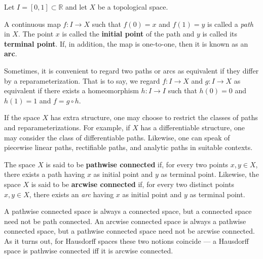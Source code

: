 \documentclass[12pt]{article}
\begin{document}
Let $I=[0,1] \subset \mathbb{R}$ and let $X$ be a topological space.

A continuous map $f:I\rightarrow X$ such that $f(0)=x$ and $f(1)=y$ is called a \emph{path} in $X$.  The point $x$ is called the {\bf initial point} of the path and $y$ is called its {\bf terminal point}.  If, in addition, the map is one-to-one, then it is known as an {\bf arc}.

Sometimes, it is convenient to regard two paths or arcs as equivalent if they differ by a reparameterization.  That is to say, we regard $f \colon I \to X$ and $g \colon I \to X$ as equivalent if there exists a homeomorphism $h \colon I \to I$ such that $h(0) = 0$ and $h(1) = 1$ and $f = g \circ h$.

If the space $X$ has extra structure, one may choose to restrict the classes of paths and reparameterizations.  For example, if $X$ has a differentiable structure, one may consider the class of differentiable paths.  Likewise, one can speak of piecewise linear paths, rectifiable paths, and analytic paths in suitable contexts.

The space $X$ is said to be {\bf pathwise connected} if, for every two points $x, y \in X$, there exists a path having $x$ as initial point and $y$ as terminal point.  Likewise, the space $X$ is said to be {\bf arcwise connected} if, for every two distinct points $x, y \in X$, there exists an \emph{arc} having $x$ as initial point and $y$ as terminal point.  

A pathwise connected space is always a connected space, but a connected space need not be path connected.  An arcwise connected space is always a pathwise connected space, but a pathwise connected space need not be arcwise connected.
As it turns out, for Hausdorff spaces these two notions coincide --- a Hausdorff space is pathwise connected iff it is arcwise connected.
\end{document}
